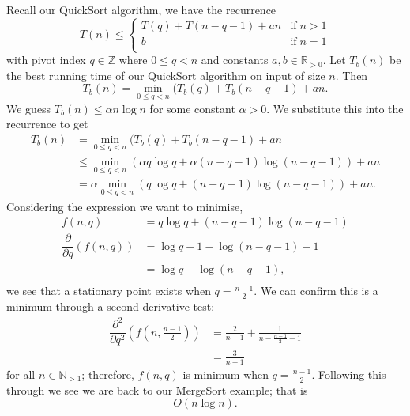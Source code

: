 \begin{example}
    Recall our QuickSort algorithm, we have the recurrence 
    \[
        T(n)\leq
        \begin{cases}
            T(q)+T(n-q-1)+an&\text{if}\;n>1\\
            b&\text{if}\;n=1\\
        \end{cases}
    \]
    with pivot index $q\in\mathbb Z$ where $0\leq q<n$ and constants $a,b\in\mathbb R_{>0}$. Let $T_b(n)$ be the best running time of our QuickSort algorithm on input of size $n$. Then \[T_b(n)=\min_{0\leq q<n}(T_b(q)+T_b(n-q-1)+an.\] We guess $T_b(n)\leq\alpha n\log{n}$ for some constant $\alpha>0$. We substitute this into the recurrence to get
    \begin{align*}
        T_b(n)&=\min_{0\leq q<n}(T_b(q)+T_b(n-q-1)+an\\
        &\leq\min_{0\leq q<n}(\alpha q\log q+\alpha(n-q-1)\log(n-q-1))+an\\
        &=\alpha\min_{0\leq q<n}(q\log q+(n-q-1)\log(n-q-1))+an.
    \end{align*}
    Considering the expression we want to minimise,
    \begin{align*}
        f(n, q) &= q \log{q} + (n - q - 1) \log{(n - q - 1)} \\
        \dfrac{\partial}{\partial q} (f(n, q)) &= \log{q} + 1 - \log{(n - q - 1)} - 1 \\
        &= \log{q} - \log{(n - q - 1)}, \\
    \end{align*}
    we see that a stationary point exists when $q = \frac{n - 1}{2}$. We can confirm this is a minimum through a second derivative test:
    \begin{align*}
        \dfrac{\partial^2}{\partial q^2}\left(f\left(n, \frac{n - 1}{2}\right)\right) &= \frac{2}{n - 1} + \frac{1}{n - \frac{n - 1}{2} - 1} \\
        &= \frac{3}{n - 1}
    \end{align*}
    for all $n \in \mathbb{N}_{>1}$; therefore, $f(n, q)$ is minimum when $q = \frac{n - 1}{2}$. Following this through we see we are back to our MergeSort example; that is \[ O(n\log{n}). \]
\end{example}

   
